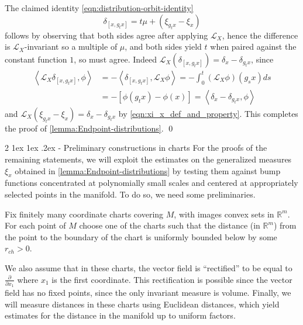 \documentclass[11pt]{amsart}
\makeatletter
\renewcommand{\subsection}
{\@startsection{subsection}
				     {2}
				     {\z@}%
                     {-3.25ex\@plus -1ex \@minus -.2ex}%
                     {1.5ex \@plus .2ex}%
                     {\normalfont \large \bfseries \sffamily}}%
\newcommand \cL {\mathcal{L}}
\newcommand \bR {\mathbb{R}}
\newcommand{\ip}[1]{\left\langle#1\right\rangle}
\theoremstyle{mytheoremstyle}
\theoremstyle{mydefinitionstyle}
\theoremstyle{mytheoremstyle}
\numberwithin{equation}{section}
\renewcommand{\subsection}
{\@startsection{subsection}
                     {2}
                     {\z@}%
                     {1ex \@plus1ex \@minus.2ex}%
                     {-\fontdimen 2\font }
                     {\normalfont\normalsize\bfseries}}
\theoremstyle{mydefinitionstyle}
\makeatother
\begin{document}
The claimed identity \autoref{eqn:distribution-orbit-identity}
\[
	\delta_{[x,g_tx]} = t \mu + (\xi_{g_tx}-\xi_x)
\]
follows by observing that both sides agree after applying $\cL_X$, hence the difference is $\cL_X$-invariant so a multiple of $\mu$, and
both sides yield $t$ when paired against the constant function $1$, so must agree.
Indeed $\cL_X(\delta_{[x,g_tx]}) =  \delta_x - \delta_{g_t x}$, since
\begin{align*}
	\ip{\cL_{X}\delta_{[x,g_tx]},\phi} & = 
	- \ip{\delta_{[x,g_t x]}, \cL_X \phi}
	= - \int_{0}^t (\cL_X\phi)(g_s x)ds\\
	& = 
	- [\phi(g_tx) - \phi(x)]
	=
	\ip{\delta_x - \delta_{g_t x},\phi}
\end{align*}
and $\cL_X(\xi_{g_t x} -\xi_x) = \delta_x - \delta_{g_tx}$ by \autoref{eqn:xi_x_def_and_property}.
This completes the proof of \autoref{lemma:Endpoint-distributions}.
\hfill \qed




\subsection{Preliminary constructions in charts}
	\label{ssec:preliminary_constructions_in_charts}
For the proofs of the remaining statements, we will exploit the estimates on the generalized measures $\xi_x$ obtained in \autoref{lemma:Endpoint-distributions} by testing them against bump functions concentrated at polynomially small scales and centered at appropriately selected points in the manifold.
To do so, we need some preliminaries.

Fix finitely many coordinate charts covering $M$, with images convex sets in $\bR^m$.
For each point of $M$ choose one of the charts such that the distance (in $\bR^m$) from the point to the boundary of the chart is uniformly bounded below by some $r_{ch}>0$.

We also assume that in these charts, the vector field is ``rectified'' to be equal to $\frac{\partial}{\partial x_1}$ where $x_1$ is the first coordinate.
This rectification is possible since the vector field has no fixed points, since the only invariant measure is volume.
Finally, we will measure distances in these charts using Euclidean distances, which yield estimates for the distance in the manifold up to uniform factors.
\end{document}
